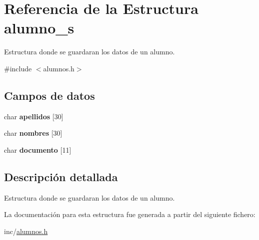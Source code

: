 \hypertarget{structalumno__s}{}\section{Referencia de la Estructura alumno\+\_\+s}
\label{structalumno__s}


Estructura donde se guardaran los datos de un alumno.  




{\ttfamily \#include $<$alumnos.\+h$>$}

\subsection*{Campos de datos}
\begin{DoxyCompactItemize}
\item 
\mbox{\label{structalumno__s_a0a7d09b25029b074b3c37c5af0b57f5b}} 
char {\bfseries apellidos} \mbox{[}30\mbox{]}
\item 
\mbox{\label{structalumno__s_a7da1db05a0e58b777b002fd9a59cfcef}} 
char {\bfseries nombres} \mbox{[}30\mbox{]}
\item 
\mbox{\label{structalumno__s_a1a6d2c52341dc5b04a6dccef26e879e2}} 
char {\bfseries documento} \mbox{[}11\mbox{]}
\end{DoxyCompactItemize}


\subsection{Descripción detallada}
Estructura donde se guardaran los datos de un alumno. 

La documentación para esta estructura fue generada a partir del siguiente fichero\+:\begin{DoxyCompactItemize}
\item 
inc/\hyperlink{alumnos_8h}{alumnos.\+h}\end{DoxyCompactItemize}
